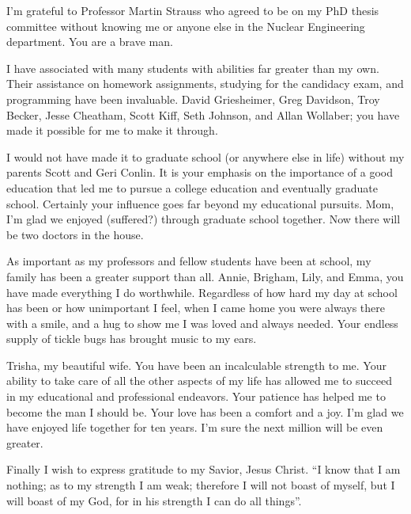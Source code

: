\begin{acknowledgments}
    I'm grateful to Professor Martin Strauss who agreed to be on my PhD thesis committee without knowing me or anyone else in the Nuclear Engineering department.  You are a brave man.

    I have associated with many students with abilities far greater than my own.  Their assistance on homework assignments, studying for the candidacy exam, and programming have been invaluable.  David Griesheimer, Greg Davidson, Troy Becker, Jesse Cheatham, Scott Kiff, Seth Johnson, and Allan Wollaber; you have made it possible for me to make it through.

    I would not have made it to graduate school (or anywhere else in life) without my parents Scott and Geri Conlin.  It is your emphasis on the importance of a good education that led me to pursue a college education and eventually graduate school.  Certainly your influence goes far beyond my educational pursuits.   Mom, I'm glad we enjoyed (suffered?) through graduate school together.  Now there will be two doctors in the house.

    As important as my professors and fellow students have been at school, my family has been a greater support than all.  Annie, Brigham, Lily, and Emma, you have made everything I do worthwhile.  Regardless of how hard my day at school has been or how unimportant I feel, when I came home you were always there with a smile, and a hug to show me I was loved and always needed.  Your endless supply of tickle bugs has brought music to my ears.

    Trisha, my beautiful wife.  You have been an incalculable strength to me.  Your ability to take care of all the other aspects of my life has allowed me to succeed in my educational and professional endeavors.  Your patience has helped me to become the man I should be.  Your love has been a comfort and a joy.  I'm glad we have enjoyed life together for ten years.  I'm sure the next million will be even greater.

    Finally I wish to express gratitude to my Savior, Jesus Christ.  ``I know that I am nothing; as to my strength I am weak; therefore I will not boast of myself, but I will boast of my God, for in his strength I can do all things''.
\end{acknowledgments}


\tableofcontents

